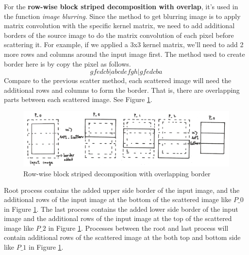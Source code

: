 \documentclass[12pt]{diazessay}
\begin{document}
For the \textbf{row-wise block striped decomposition with overlap}, it's used in the function \textit{image blurring}. Since the method to get blurring image is to apply matrix convolution with the specific kernel matrix, we need to add additional borders of the source image to do the matrix convolution of each pixel before scattering it. For example, if we applied a 3x3 kernel matrix, we'll need to add 2 more rows and columns around the input image first. The method used to create border here is by copy the pixel as follows. $$gfedcb|abcdefgh|gfedcba$$ Compare to the previous scatter method, each scattered image will need the additional rows and columns to form the border. That is, there are overlapping parts between each scattered image. See Figure \ref{row_wise_overlap}.
\begin{figure}[h]
    \centering
	\includegraphics[scale=0.6, clip]{pics/row_wise_overlap.jpg}
	\caption {Row-wise block striped decomposition with overlapping border}
	\label{row_wise_overlap}
\end{figure}
\newline
Root process contains the added upper side border of the input image, and the additional rows of the input image at the bottom of the scattered image like $P\_0$ in Figure \ref{row_wise_overlap}. The last process contains the added lower side border of the input image and the additional rows of the input image at the top of the scattered image like $P\_2$ in Figure \ref{row_wise_overlap}. Processes between the root and last process will contain additional rows of the scattered image at the both top and bottom side like $P\_1$ in Figure \ref{row_wise_overlap}.
\end{document}
